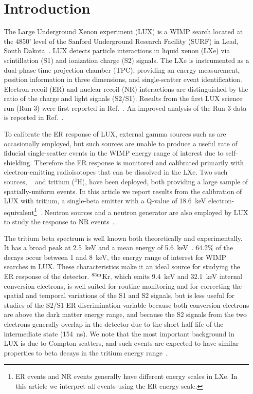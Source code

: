 \section{Introduction}

The Large Underground Xenon experiment (LUX) is a WIMP search located at the 4850' level of the Sanford Underground Research Facility (SURF) in Lead, South Dakota~\cite{lux-nim}. LUX detects particle interactions in liquid xenon (LXe) via scintillation (S1) and ionization charge (S2) signals. The LXe is instrumented as a dual-phase time projection chamber (TPC), providing an energy measurement, position information in three dimensions, and single-scatter event identification. Electron-recoil (ER) and nuclear-recoil (NR) interactions are distinguished by the ratio of the charge and light signals (S2/S1). Results from the first LUX science run (Run 3) were first reported in Ref.~\cite{lux-prl}. An improved analysis of the Run 3 data is reported in Ref.~\cite{lux-reanalysis}.

To calibrate the ER response of LUX, external gamma sources such as \cssrc are occasionally employed, but such sources are unable to produce a useful rate of fiducial single-scatter events in the WIMP energy range of interest due to self-shielding. Therefore the ER response is monitored and calibrated primarily with electron-emitting radioisotopes that can be dissolved in the LXe. Two such sources,  \krsrc~\cite{Kastens:2009rt, Baudis} and tritium ($^{3}$H), have been deployed, both providing a large sample of spatially-uniform events. In this article we report results from the calibration of LUX with tritium, a single-beta emitter with a Q-value of 18.6~keV electron-equivalent\footnote{ER events and NR events generally have different energy scales in LXe. In this article we interpret all events using the ER energy scale.}~\cite{Tritium_Q}. Neutron sources and a neutron generator are also employed by LUX to study the response to NR events~\cite{DD-paper}.

The tritium beta spectrum is well known both theoretically and experimentally. It has a broad peak at 2.5~keV and a mean energy of 5.6~keV~\cite{Tritium_Mean,Tritium_Eq,Drexlin:2013lha}. 64.2\% of the decays occur between 1 and 8~keV, the energy range of interest for WIMP searches in LUX. These characteristics make it an ideal source for studying the ER response of the detector.  $\rm ^{83m}$Kr, which emits 9.4~keV and 32.1~keV internal conversion electrons, is well suited for routine monitoring and for correcting the spatial and temporal variations of the S1 and S2 signals, but is less useful for studies of the S2/S1 ER discrimination variable because both conversion electrons are above the dark matter energy range, and because the S2 signals from the two electrons generally overlap in the detector due to the short half-life of the intermediate state (154~ns). We note that the most important background in LUX is due to Compton scatters, and such events are expected to have similar properties to beta decays in the tritium energy range~\cite{NEST_2013}. 

